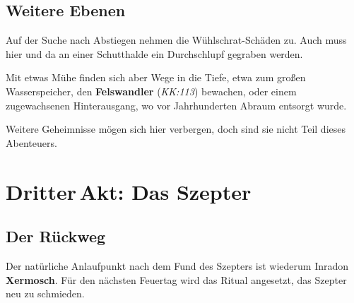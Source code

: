 \subsection{Weitere Ebenen}
Auf der Suche nach Abstiegen nehmen die Wühlschrat-Schäden zu. Auch muss hier und da an einer Schutthalde ein Durchschlupf gegraben werden.

Mit etwas Mühe finden sich aber Wege in die Tiefe, etwa zum großen Wasserspeicher, den \textbf{Felswandler} (\emph{KK:113}) bewachen, oder einem zugewachsenen Hinterausgang, wo vor Jahrhunderten Abraum entsorgt wurde.

Weitere Geheimnisse mögen sich hier verbergen, doch sind sie nicht Teil dieses Abenteuers.

\spaltenende

\neueseite

\section{Dritter\,Akt: Das Szepter}
\spaltenanfang
\subsection{Der Rückweg}
\label{zuruck}


Der natürliche Anlaufpunkt nach dem Fund des Szepters ist wiederum Inradon \textbf{Xermosch}.
Für den nächsten Feuertag wird das Ritual angesetzt, das Szepter neu zu schmieden.
